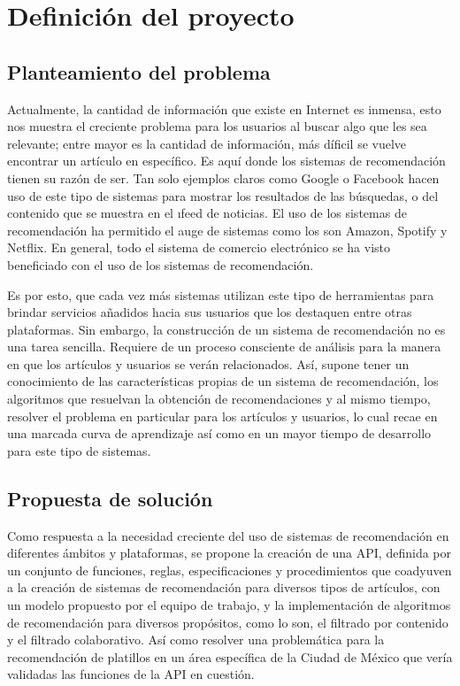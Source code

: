 \chapter {Definici\'on del proyecto}
	\section{Planteamiento del problema}
		Actualmente, la cantidad de información que existe en Internet es inmensa, esto nos muestra el creciente problema para los usuarios al buscar algo que les sea relevante; entre mayor es la cantidad de información, más díficil se vuelve encontrar un artículo en específico. Es aquí donde los sistemas de recomendación tienen su razón de ser. Tan solo ejemplos claros como Google o Facebook hacen uso de este tipo de sistemas para mostrar los resultados de las búsquedas, o del contenido que se muestra en el \i{feed} de noticias. El uso de los sistemas de recomendación ha permitido el auge de sistemas como los son Amazon, Spotify y Netflix. En general, todo el sistema de comercio electrónico se ha visto beneficiado con el uso de los sistemas de recomendación. 

		Es por esto, que cada vez más sistemas utilizan este tipo de herramientas para brindar servicios añadidos hacia sus usuarios que los destaquen entre otras plataformas. Sin embargo, la construcción de un sistema de recomendación no es una tarea sencilla. Requiere de un proceso consciente de análisis para la manera en que los artículos y usuarios se verán relacionados. Así, supone tener un conocimiento de las características propias de un sistema de recomendación, los algoritmos que resuelvan la obtención de recomendaciones y al mismo tiempo, resolver el problema en particular para los artículos y usuarios, lo cual recae en una marcada curva de aprendizaje así como en un mayor tiempo de desarrollo para este tipo de sistemas.

	\section{Propuesta de solución}
		Como respuesta a la necesidad creciente del uso de sistemas de recomendación en diferentes ámbitos y plataformas, se propone la creación de una API, definida por un conjunto de funciones, reglas, especificaciones y procedimientos que coadyuven a la creación de sistemas de recomendación para diversos tipos de artículos, con un modelo propuesto por el equipo de trabajo, y la implementación de algoritmos de recomendación para diversos propósitos, como lo son, el filtrado por contenido y el filtrado colaborativo. Así como resolver una problemática para la recomendación de platillos en un área específica de la Ciudad de México que vería validadas las funciones de la API en cuestión. 

